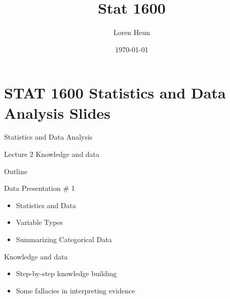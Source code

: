 \documentclass[14pt]{beamer}\usepackage[]{graphicx}\usepackage[]{color}
\title{Stat 1600}
\author{Loren Heun}
\institute{WMU}
\date{\today}
\begin{document}
\frame{\titlepage}







{\tiny{
\tableofcontents
}}



\section{STAT 1600 Statistics and Data Analysis Slides}

\begin{frame}[fragile]{Statistics and Data Analysis}

Lecture 2 Knowledge and data

\end{frame}

\begin{frame}[fragile]{Outline}

Data Presentation \# 1

\begin{itemize}
\item Statistics and Data
\item Variable Types
\item Summarizing Categorical Data
\end{itemize}
\end{frame}

\begin{frame}[fragile]{Knowledge and data}

\begin{itemize}
\item Step-by-step knowledge building
\item Some fallacies in interpreting evidence
\end{itemize}
\end{frame}
\end{document}
